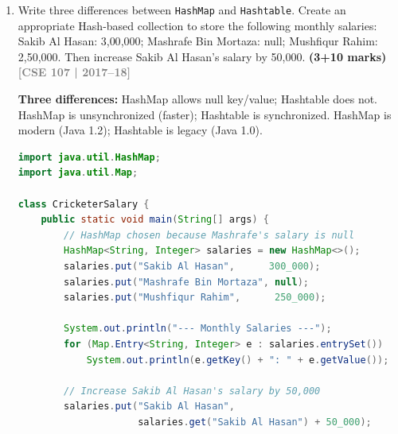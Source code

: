 \documentclass[12pt,a3paper]{article}
\newcommand{\yr}[1]{\hfill\textcolor{gray}{\small\textbf{[#1]}}}
\newcommand{\mk}[1]{\textcolor{orange!70!black}{\small\textbf{(#1 marks)}}}
\begin{document}
\begin{enumerate}
\begin{tcolorbox}
\begin{lstlisting}[language=Java]
interface Y { void doY(); }
interface X { void doX(); }
class Z     { void doZ() {} }

// S must extend Z and implement both Y and X
public class ABC<S extends Z & Y & X> {
    void use(S s) {
        s.doZ(); s.doY(); s.doX(); // all accessible
    }
}

class Concrete extends Z implements Y, X {
    public void doY() {}
    public void doX() {}
}

// ABC<Concrete> ok = new ABC<>();  // valid
\end{lstlisting}
\end{tcolorbox}

\item Write three differences between \texttt{HashMap} and \texttt{Hashtable}. Create an appropriate Hash-based collection to store the following monthly salaries: Sakib Al Hasan: 3{,}00{,}000; Mashrafe Bin Mortaza: null; Mushfiqur Rahim: 2{,}50{,}000. Then increase Sakib Al Hasan's salary by 50{,}000. \mk{3+10}
\yr{CSE 107 | 2017--18}

\begin{tcolorbox}[enhanced,breakable,ansbox,
  colback=cG!4,colframe=cG,boxrule=0.8pt,arc=5pt,
  title={\textbf{Answer --- Cricketer Salaries with HashMap}},
  fonttitle=\bfseries\color{white},colbacktitle=cG]

\textbf{Three differences:} HashMap allows null key/value; Hashtable
does not. HashMap is unsynchronized (faster); Hashtable is synchronized.
HashMap is modern (Java 1.2); Hashtable is legacy (Java 1.0).

\begin{lstlisting}[language=Java]
import java.util.HashMap;
import java.util.Map;

class CricketerSalary {
    public static void main(String[] args) {
        // HashMap chosen because Mashrafe's salary is null
        HashMap<String, Integer> salaries = new HashMap<>();
        salaries.put("Sakib Al Hasan",      300_000);
        salaries.put("Mashrafe Bin Mortaza", null);
        salaries.put("Mushfiqur Rahim",      250_000);

        System.out.println("--- Monthly Salaries ---");
        for (Map.Entry<String, Integer> e : salaries.entrySet())
            System.out.println(e.getKey() + ": " + e.getValue());

        // Increase Sakib Al Hasan's salary by 50,000
        salaries.put("Sakib Al Hasan",
                     salaries.get("Sakib Al Hasan") + 50_000);


\end{lstlisting}
\end{tcolorbox}
\end{enumerate}
\end{document}
